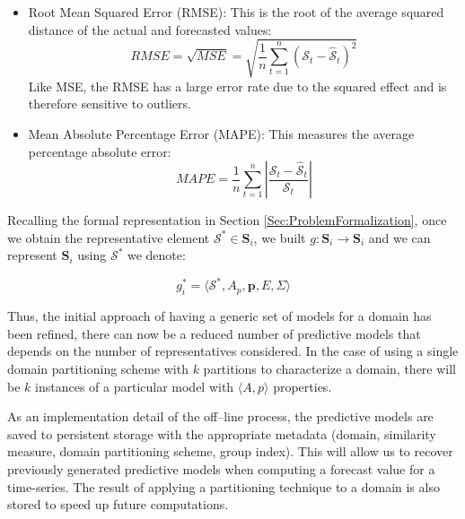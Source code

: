 \begin{itemize}
	\item Root Mean Squared Error (RMSE): This is the root of the average squared distance of the actual and forecasted values:
	\begin{equation}
	RMSE = \sqrt{MSE} = \sqrt{\frac{1}{n} \sum_{t=1}^{n} \left(\mathcal{S}_{t} - \mathcal{\hat{S}}_t\right)^{2}}
	\end{equation}
	Like MSE, the RMSE has a large error rate due to the squared effect and is therefore sensitive to outliers.
	\item Mean Absolute Percentage Error (MAPE): This measures the average percentage
	absolute error:
	\begin{equation}
	MAPE = \frac{1}{n} \sum_{t=1}^{n} \left|\frac{\mathcal{S}_{t} - \mathcal{\hat{S}}_{t}}{\mathcal{S}_{t}}\right|
	\end{equation}
\end{itemize}

Recalling the formal representation in Section \ref{Sec:ProblemFormalization}, once we obtain the representative element $\mathcal{S}^{*} \in \mathbf{S}_{i}$, we built $g:\mathbf{S}_{i} \to \mathbf{S}_{i}$ and we can represent $\mathbf{S}_{i}$ using $\mathcal{S}^{*}$ we denote:

\begin{equation}
g^{*}_{i} = \langle \mathcal{S}^{*}, A_p, \mathbf{p}, E, \varSigma \rangle
\end{equation}

Thus, the initial approach of having a generic set of models for a domain has been refined, there can now be a reduced number of predictive models that depends on the number of representatives considered. In the case of using a single domain partitioning scheme with $k$ partitions to characterize a domain, there will be $k$ instances of a particular model with $\langle A, p \rangle$ properties. 

As an implementation detail of the off--line process, the predictive models are saved to persistent storage with the appropriate metadata (domain, similarity measure, domain partitioning scheme, group index). This will allow us to recover previously generated predictive models when computing a forecast value for a time-series. The result of applying a partitioning technique to a domain is also stored to speed up future computations.

